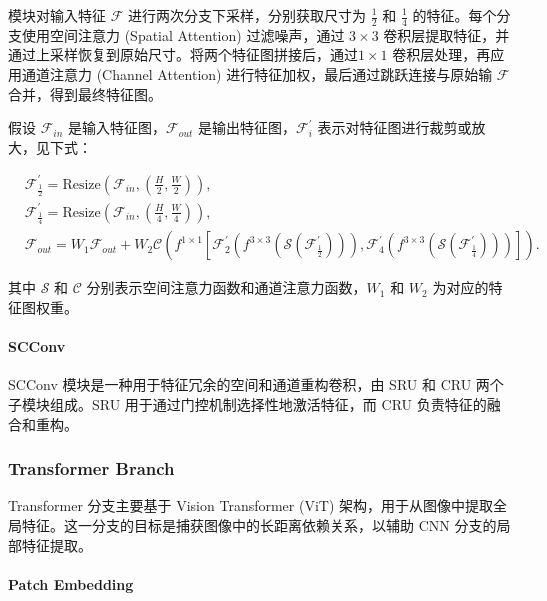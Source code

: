 \documentclass[a4paper]{ctexart}
\begin{document}
	模块对输入特征 $\mathcal{F}$ 进行两次分支下采样，分别获取尺寸为 $\frac{1}{2}$ 和 $\frac{1}{4}$ 的特征。每个分支使用空间注意力 (Spatial Attention) 过滤噪声，通过 $3 \times 3$ 卷积层提取特征，并通过上采样恢复到原始尺寸。将两个特征图拼接后，通过$ 1 \times 1$ 卷积层处理，再应用通道注意力 (Channel Attention) 进行特征加权，最后通过跳跃连接与原始输 $\mathcal{F}$ 合并，得到最终特征图。
	
	假设 $\mathcal{F}_{in}$ 是输入特征图，$\mathcal{F}_{out}$ 是输出特征图，$\mathcal{F}_{i}^\prime$ 表示对特征图进行裁剪或放大，见下式：
	
	\begin{equation}
		\begin{aligned}
			&\mathcal{F}^\prime_{\frac{1}{2}} = \text{Resize}\left(\mathcal{F}_{in},\left(\frac{H}{2},\frac{W}{2}\right)\right), \\
			&\mathcal{F}^\prime_{\frac{1}{4}} = \text{Resize}\left(\mathcal{F}_{in},\left(\frac{H}{4},\frac{W}{4}\right)\right), \\
			&\mathcal{F}_{out} = W_1\mathcal{F}_{out} + W_2\mathcal{C} \left( f^{1 \times 1}  \left[\mathcal{F}^\prime_2 (f^{3 \times 3}(\mathcal{S}(\mathcal{F}^\prime_{\frac{1}{2}}))), \mathcal{F}^\prime_4 (f^{3 \times 3}(\mathcal{S}(\mathcal{F}^\prime_{\frac{1}{4}})))\right] \right).
		\end{aligned}
		\label{eq: ARMB}
	\end{equation}
	
	其中 $\mathcal{S}$ 和 $\mathcal{C}$ 分别表示空间注意力函数和通道注意力函数，$W_1$ 和 $W_2$ 为对应的特征图权重。
	
	\paragraph{SCConv}
	
	SCConv 模块是一种用于特征冗余的空间和通道重构卷积，由 SRU 和 CRU 两个子模块组成。SRU 用于通过门控机制选择性地激活特征，而 CRU 负责特征的融合和重构。
	
	\subsubsection{Transformer Branch}
	
	Transformer 分支主要基于 Vision Transformer (ViT) 架构，用于从图像中提取全局特征。这一分支的目标是捕获图像中的长距离依赖关系，以辅助 CNN 分支的局部特征提取。
	
	\paragraph{Patch Embedding}
	
\end{document}
